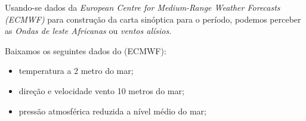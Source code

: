 Usando-se dados da \textit{European Centre for Medium-Range Weather Forecasts (ECMWF)}
para construção da carta sinóptica para o período, podemos perceber as 
\textit{Ondas de leste Africanas} ou \textit{ventos alísios}.

Baixamos os seguintes dados do (ECMWF):
\begin{itemize}
  \item temperatura a 2 metro do mar;
  \item direção e velocidade vento 10 metros do mar;
  \item pressão atmosférica reduzida a nível médio do mar;
\end{itemize}



